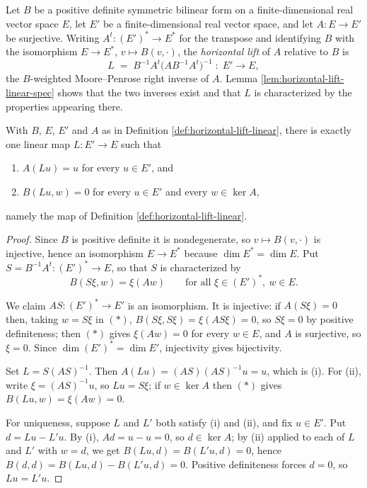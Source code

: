 \begin{definition}
\label{def:horizontal-lift-linear}
\leanok
Let $B$ be a positive definite symmetric bilinear form on a finite-dimensional real vector space $E$, let $E'$ be a finite-dimensional real vector space, and let $A : E \to E'$ be surjective. Writing $A^t : (E')^* \to E^*$ for the transpose and identifying $B$ with the isomorphism $E \to E^*$, $v \mapsto B(v, \cdot)$, the \emph{horizontal lift} of $A$ relative to $B$ is
\[
L \;=\; B^{-1}A^t\bigl(AB^{-1}A^t\bigr)^{-1} \;:\; E' \to E ,
\]
the $B$-weighted Moore--Penrose right inverse of $A$. Lemma \ref{lem:horizontal-lift-linear-spec} shows that the two inverses exist and that $L$ is characterized by the properties appearing there.
\end{definition}

\begin{lemma}
\label{lem:horizontal-lift-linear-spec}
\leanok
{}
With $B$, $E$, $E'$ and $A$ as in Definition \ref{def:horizontal-lift-linear}, there is exactly one linear map $L : E' \to E$ such that
\begin{enumerate}
\item[(i)] $A(Lu) = u$ for every $u \in E'$, and
\item[(ii)] $B(Lu, w) = 0$ for every $u \in E'$ and every $w \in \ker A$,
\end{enumerate}
namely the map of Definition \ref{def:horizontal-lift-linear}.
\end{lemma}

\begin{proof}
\leanok
{}
Since $B$ is positive definite it is nondegenerate, so $v \mapsto B(v,\cdot)$ is injective, hence an isomorphism $E \to E^*$ because $\dim E^* = \dim E$. Put $S = B^{-1}A^t : (E')^* \to E$, so that $S$ is characterized by
\begin{equation}
B(S\xi, w) = \xi(Aw) \qquad \text{for all } \xi \in (E')^*,\ w \in E. \tag{$*$}
\end{equation}

We claim $AS : (E')^* \to E'$ is an isomorphism. It is injective: if $A(S\xi) = 0$ then, taking $w = S\xi$ in $(*)$, $B(S\xi, S\xi) = \xi(A S\xi) = 0$, so $S\xi = 0$ by positive definiteness; then $(*)$ gives $\xi(Aw) = 0$ for every $w \in E$, and $A$ is surjective, so $\xi = 0$. Since $\dim (E')^* = \dim E'$, injectivity gives bijectivity.

Set $L = S(AS)^{-1}$. Then $A(Lu) = (AS)(AS)^{-1}u = u$, which is (i). For (ii), write $\xi = (AS)^{-1}u$, so $Lu = S\xi$; if $w \in \ker A$ then $(*)$ gives $B(Lu, w) = \xi(Aw) = 0$.

For uniqueness, suppose $L$ and $L'$ both satisfy (i) and (ii), and fix $u \in E'$. Put $d = Lu - L'u$. By (i), $Ad = u - u = 0$, so $d \in \ker A$; by (ii) applied to each of $L$ and $L'$ with $w = d$, we get $B(Lu, d) = B(L'u, d) = 0$, hence $B(d,d) = B(Lu,d) - B(L'u,d) = 0$. Positive definiteness forces $d = 0$, so $Lu = L'u$.
\end{proof}

